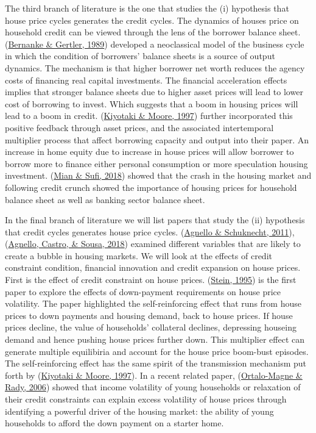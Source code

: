 \documentclass[
  12pt,
]{article}
\begin{document}
The third branch of literature is the one that studies the (i) hypothesis that house price cycles generates the credit cycles. The dynamics of houses price on household credit can be viewed through the lens of the borrower balance sheet. (\protect\hyperlink{ref-bernanke_agency_1989}{Bernanke \& Gertler, 1989}) developed a neoclassical model of the business cycle in which the condition of borrowers' balance sheets is a source of output dynamics. The mechanism is that higher borrower net worth reduces the agency costs of financing real capital investments. The financial acceleration effects implies that stronger balance sheets due to higher asset prices will lead to lower cost of borrowing to invest. Which suggests that a boom in housing prices will lead to a boom in credit. (\protect\hyperlink{ref-kiyotaki_credit_1997}{Kiyotaki \& Moore, 1997}) further incorporated this positive feedback through asset prices, and the associated intertemporal multiplier process that affect borrowing capacity and output into their paper. An increase in home equity due to increase in house prices will allow borrower to borrow more to finance either personal consumption or more speculation housing investment. (\protect\hyperlink{ref-mian_credit_2018}{Mian \& Sufi, 2018}) showed that the crash in the housing market and following credit crunch showed the importance of housing prices for household balance sheet as well as banking sector balance sheet.

In the final branch of literature we will list papers that study the (ii) hypothesis that credit cycles generates house price cycles. (\protect\hyperlink{ref-agnello_booms_2011}{Agnello \& Schuknecht, 2011}), (\protect\hyperlink{ref-agnello_economic_2018}{Agnello, Castro, \& Sousa, 2018}) examined different variables that are likely to create a bubble in housing markets. We will look at the effects of credit constraint condition, financial innovation and credit expansion on house prices. First is the effect of credit constraint on house prices. (\protect\hyperlink{ref-stein_prices_1995}{Stein, 1995}) is the first paper to explore the effects of down-payment requirements on house price volatility. The paper highlighted the self-reinforcing effect that runs from house prices to down payments and housing demand, back to house prices. If house prices decline, the value of households' collateral declines, depressing houseing demand and hence pushing house prices further down. This multiplier effect can generate multiple equilibiria and account for the house price boom-bust episodes. The self-reinforcing effect has the same spirit of the transmission mechanism put forth by (\protect\hyperlink{ref-kiyotaki_credit_1997}{Kiyotaki \& Moore, 1997}). In a recent related paper, (\protect\hyperlink{ref-ortalo-magne_housing_2006}{Ortalo-Magne \& Rady, 2006}) showed that income volatility of young households or relaxation of their credit constraints can explain excess volatility of house prices through identifying a powerful driver of the housing market: the ability of young households to afford the down payment on a starter home.
\end{document}
